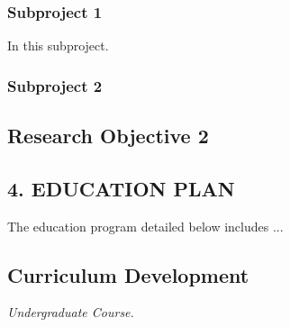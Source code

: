 \documentclass[../preamble.tex]{subfiles}
\begin{document}
\subsubsection{Subproject 1}
In this subproject.
\subsubsection{Subproject 2}

\subsection{Research Objective 2}

%
%

\subsection{4. EDUCATION PLAN} %
 The education program detailed below includes ... 
\subsection{Curriculum Development}
\noindent \textit{Undergraduate Course.}
\end{document}
